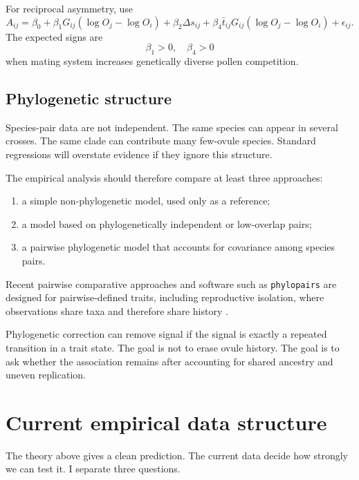 \documentclass[12pt]{article}
\begin{document}
For reciprocal asymmetry, use
\begin{equation}
A_{ij}=\beta_0+\beta_1G_{ij}(\log O_j-\log O_i)+\beta_2\Delta s_{ij}
+\beta_4\bar{t}_{ij}G_{ij}(\log O_j-\log O_i)+\epsilon_{ij}.
\label{eq:empiricalA}
\end{equation}
The expected signs are
\begin{equation}
\beta_1>0,
\quad
\beta_4>0
\end{equation}
when mating system increases genetically diverse pollen competition.

\subsection{Phylogenetic structure}

Species-pair data are not independent. The same species can appear in several crosses. The same clade can contribute many few-ovule species. Standard regressions will overstate evidence if they ignore this structure.

The empirical analysis should therefore compare at least three approaches:
\begin{enumerate}
\item a simple non-phylogenetic model, used only as a reference;
\item a model based on phylogenetically independent or low-overlap pairs;
\item a pairwise phylogenetic model that accounts for covariance among species pairs.
\end{enumerate}
Recent pairwise comparative approaches and software such as \texttt{phylopairs} are designed for pairwise-defined traits, including reproductive isolation, where observations share taxa and therefore share history \citep{Anderson2025}.

\begin{cautionbox}
Phylogenetic correction can remove signal if the signal is exactly a repeated transition in a trait state. The goal is not to erase ovule history. The goal is to ask whether the association remains after accounting for shared ancestry and uneven replication.
\end{cautionbox}


\section{Current empirical data structure}

The theory above gives a clean prediction. The current data decide how strongly we can test it. I separate three questions.
\end{document}
